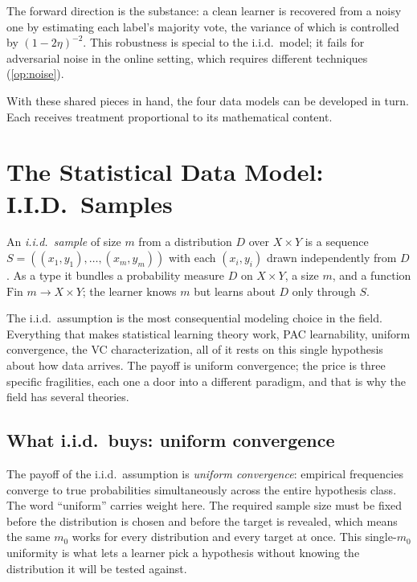 The forward direction is the substance: a clean learner is recovered from a noisy one by estimating each label's majority vote, the variance of which is controlled by $(1-2\eta)^{-2}$. This robustness is special to the i.i.d.\ model; it fails for adversarial noise in the online setting, which requires different techniques (\cref{op:noise}).

\medskip

With these shared pieces in hand, the four data models can be developed in turn. Each receives treatment proportional to its mathematical content.


\section{The Statistical Data Model: I.I.D.\ Samples}
\label{sec:iid}

\begin{defn}[I.I.D.\ Sample]
\label{def:iid-sample}
An \emph{i.i.d.\ sample} of size $m$ from a distribution $D$ over $X \times Y$ is a sequence $S = ((x_1, y_1), \ldots, (x_m, y_m))$ with each $(x_i, y_i)$ drawn independently from $D$. As a type it bundles a probability measure $D$ on $X \times Y$, a size $m$, and a function $\text{Fin } m \to X \times Y$; the learner knows $m$ but learns about $D$ only through $S$.
\end{defn}

The i.i.d.\ assumption is the most consequential modeling choice in the field. Everything that makes statistical learning theory work, PAC learnability, uniform convergence, the VC characterization, all of it rests on this single hypothesis about how data arrives. The payoff is uniform convergence; the price is three specific fragilities, each one a door into a different paradigm, and that is why the field has several theories.

\subsection{What i.i.d.\ buys: uniform convergence}

The payoff of the i.i.d.\ assumption is \emph{uniform convergence}: empirical frequencies converge to true probabilities simultaneously across the entire hypothesis class. The word ``uniform'' carries weight here. The required sample size must be fixed before the distribution is chosen and before the target is revealed, which means the same $m_0$ works for every distribution and every target at once. This single-$m_0$ uniformity is what lets a learner pick a hypothesis without knowing the distribution it will be tested against.

